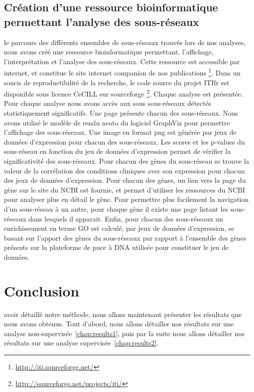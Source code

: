 		\subsection{\textcolor{mygreen}{Création d'une ressource bioinformatique permettant l'analyse des sous-réseaux}}
			 le parcours des différents ensembles de sous-réseaux trouvés lors de nos analyses, nous avons créé une ressource bioinformatique permettant, l'affichage, l'interprétation et l'analyse des sous-réseaux.
			Cette ressource est accessible par internet, et constitue le site internet companion de nos publications \footnote{\url{http://iti.sourceforge.net/}}.
			Dans un soucis de reproductibilité de la recherche, le code source du projet \ac{ITIfr} est disponible sous licence CeCILL sur sourceforge \footnote{\url{http://sourceforge.net/projects/iti/}}.
			Chaque analyse est présentée.
			Pour chaque analyse nous avons accès aux sous sous-réseaux détectés statistiquement significatifs.
			Une page présente chacun des sous-réseaux.
			Nous avons utilisé le modèle de rendu neato du logiciel GraphViz pour permettre l'affichage des sous-réseaux.
			Une image en format png est générée par jeux de données d'expression pour chacun des sous-réseaux.
			Les scores et les p-values du sous-réseau en fonction du jeu de données d'expression permet de vérifier la significativité des sous-réseaux.
			Pour chacun des gènes du sous-réseau se trouve la valeur de la corrélation des conditions cliniques avec son expression pour chacun des jeux de données d'expression.
			Pour chacun des gènes, un lien vers la page du gène sur le site du NCBI est fournie, et permet d'utiliser les ressources du NCBI pour analyser plus en détail le gène.
			Pour permettre plus facilement la navigation d'un sous-réseau à un autre, pour chaque gène il existe une page listant les sous-réseaux dans lesquels il apparait.
			Enfin, pour chacun des sous-réseaux un enrichissement en terme GO est calculé, par jeux de données d'expression, se basant sur l'apport des gènes du sous-réseaux par rapport à l'ensemble des gènes présents sur la plateforme de puce à \acs{DNA} utilisée pour constituer le jeu de données.


	\section{\textcolor{mygreen}{Conclusion}}
		 avoir détaillé notre méthode, nous allons maintenant présenter les résultats que nous avons obtenus. Tout d'abord, nous allons détailler nos résultats sur une analyse non-supervisée~\ref{chap:results1}, puis par la suite nous allons détailler nos résultats sur une analyse supervisée~\ref{chap:results2}.